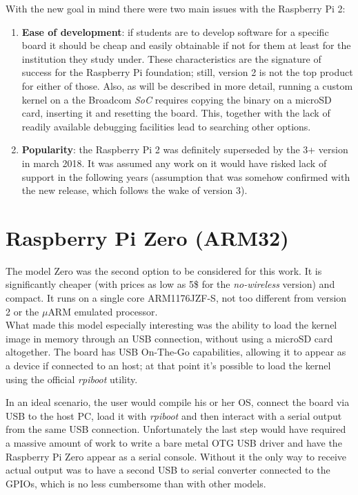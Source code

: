 \documentclass[12pt,a4paper,openright,twoside]{report}
\begin{document}
With the new goal in mind there were two main issues with the Raspberry Pi 2:
\begin{enumerate}
    \item \textbf{Ease of development}: if students are to develop software
            for a specific board it should be cheap and easily obtainable if 
            not for them at least for the institution they study under.
            These characteristics are the signature of success for the Raspberry Pi
            foundation; still, version 2 is not the top product for either of
            those.
            Also, as will be described in more detail, running a custom kernel 
            on a the Broadcom \textit{SoC} requires copying the binary on a 
            microSD card, inserting it and resetting the board. This, together
            with the lack of readily available debugging facilities lead to searching
            other options.
    \item \textbf{Popularity}: the Raspberry Pi 2 was definitely superseded by the
            3+ version in march 2018. It was assumed any work on it would have
            risked lack of support in the following years (assumption that was
            somehow confirmed with the new release, which follows the wake of 
             version 3).
\end{enumerate}


\section{Raspberry Pi Zero (ARM32)}
The model Zero was the second option to be considered for this work. It is 
significantly cheaper (with prices as low as 5\$ for the \textit{no-wireless} version)
and compact. It runs on a single core ARM1176JZF-S, not too different from
version 2 or the $\mu$ARM emulated processor.\\
What made this model especially interesting was the ability to load the kernel
image in memory through an USB connection, without using a microSD card altogether.
The board has USB On-The-Go capabilities, allowing it to appear as a device if connected
to an host; at that point it's possible to load the kernel using the official
 \textit{rpiboot} utility.

In an ideal scenario, the user would compile his or her OS, connect the board
via USB to the host PC, load it with \textit{rpiboot} and then interact with a
serial output from the same USB connection.
Unfortunately the last step would have required a massive amount of work to write
a bare metal OTG USB driver and have the Raspberry Pi Zero appear as a serial 
console. Without it the only way to receive actual output was to have a second
USB to serial converter connected to the GPIOs, which is no less cumbersome than
with other models.
\end{document}
